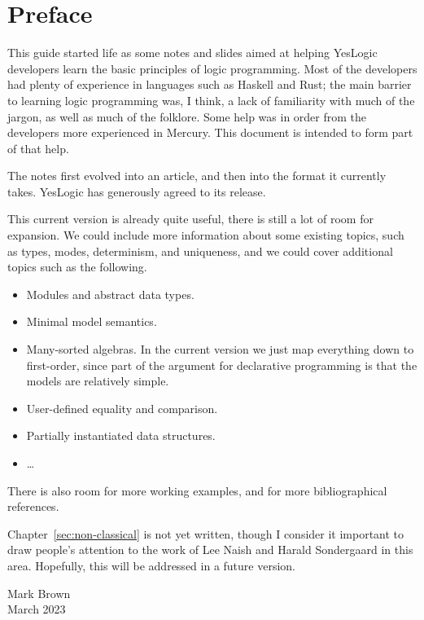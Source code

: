 \chapter{Preface}

This guide
started life as some notes and slides
aimed at helping YesLogic developers
learn the basic principles of logic programming.
Most of the developers had plenty of experience
in languages such as Haskell and Rust;
the main barrier to learning logic programming was, I think,
a lack of familiarity with much of the jargon,
as well as much of the folklore.
Some help was in order from the developers more experienced in Mercury.
This document is intended to form part of that help.

The notes first evolved into an article,
and then into the format it currently takes.
YesLogic has generously agreed to its release.

This current version is already quite useful,
there is still a lot of room for expansion.
We could include more information about some existing topics,
such as types, modes, determinism, and uniqueness,
and we could cover additional topics such as the following.
\begin{itemize}
\item
Modules and abstract data types.
\item
Minimal model semantics.
\item
Many-sorted algebras.
In the current version we just map everything down to first-order,
since part of the argument for declarative programming
is that the models are relatively simple.
\item
User-defined equality and comparison.
\item
Partially instantiated data structures.
\item
\ldots
\end{itemize}
There is also room for more working examples,
and for more bibliographical references.

Chapter~\ref{sec:non-classical} is not yet written,
though I consider it important to draw people's attention
to the work of Lee Naish and Harald Sondergaard in this area.
Hopefully, this will be addressed in a future version.

\bigskip
\noindent
Mark Brown \\
March 2023

